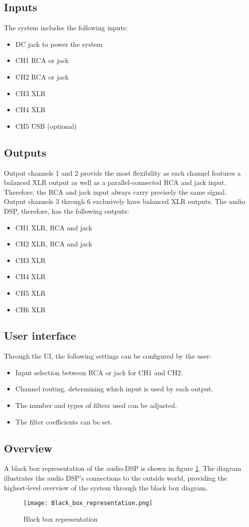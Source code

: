\subsection{Inputs}
The system includes the following inputs:
\begin{itemize}
    \item DC jack to power the system
    \item CH1 RCA or jack
    \item CH2 RCA or jack
    \item CH3 XLR
    \item CH4 XLR
    \item CH5 USB (optional)
\end{itemize}

\subsection{Outputs}
Output channels 1 and 2 provide the most flexibility as each channel features a balanced XLR output as well as a parallel-connected RCA and jack input. Therefore, the RCA and jack input always carry precisely the same signal. Output channels 3 through 6 exclusively have balanced XLR outputs. The audio DSP, therefore, has the following outputs:

\begin{itemize}
    \item CH1 XLR, RCA and jack
    \item CH2 XLR, RCA and jack
    \item CH3 XLR
    \item CH4 XLR
    \item CH5 XLR
    \item CH6 XLR
\end{itemize}

\subsection{User interface}
Through the UI, the following settings can be configured by the user:
\begin{itemize}
    \item Input selection between RCA or jack for CH1 and CH2.
    \item Channel routing, determining which input is used by each output.
    \item The number and types of filters used can be adjusted.
    \item The filter coefficients can be set.
\end{itemize}

\subsection{Overview}
A black box representation of the audio-DSP is shown in figure \ref{fig:Black-box-rep}. The diagram illustrates the audio DSP's connections to the outside world, providing the highest-level overview of the system through the black box diagram.
\begin{figure}[ht]
    \centering\texttt{[image: Black\_box\_representation.png]}
    \caption{Black box representation}
    \label{fig:Black-box-rep}
\end{figure}